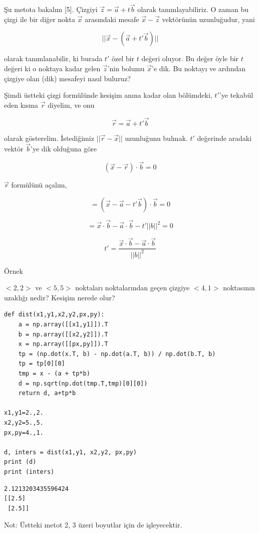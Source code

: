 \documentclass[12pt,fleqn]{article}\usepackage{../../common}
\begin{document}
Şu metota bakalım [5]. Çizgiyi $\vec{z} = \vec{a} + t \vec{b}$ olarak
tanımlayabiliriz. O zaman bu çizgi ile bir diğer nokta $\vec{x}$ arasındaki
mesafe $\vec{x}-\vec{z}$ vektörünün uzunluğudur, yani

$$
|| \vec{x} - (\vec{a} + t' \vec{b}) ||
$$

olarak tanımlanabilir, ki burada $t'$ özel bir $t$ değeri oluyor. Bu değer öyle
bir $t$ değeri ki o noktaya kadar gelen $\vec{z}$'nin bolumu $\vec{x}$'e dik. Bu
noktayı ve ardından çizgiye olan (dik) mesafeyi nasıl buluruz?

Şimdi üstteki çizgi formülünde kesişim anına kadar olan bölümdeki, $t'$'ye
tekabül eden kısma $\vec{r}$ diyelim, ve onu

$$
\vec{r} = \vec{a} + t' \vec{b}
$$

olarak gösterelim. İstediğimiz $||\vec{r}-\vec{x}||$ uzunluğunu bulmak. $t'$
değerinde aradaki vektör $\vec{b}$'ye dik olduğuna göre

$$
(\vec{x} - \vec{r}) \cdot \vec{b} = 0
$$

$\vec{r}$ formülünü açalım,

$$
= (\vec{x} - \vec{a} - t' \vec{b}) \cdot \vec{b} = 0
$$

$$
= \vec{x}\cdot\vec{b} - \vec{a}\cdot\vec{b} - t'||b||^2 = 0
$$

$$
t' = \frac{\vec{x}\cdot\vec{b} - \vec{a}\cdot\vec{b}}{||b||^2}
$$

Örnek

$<2,2>$ ve $<5,5>$ noktaları noktalarından geçen çizgiye $<4,1>$ noktasının
uzaklığı nedir? Kesişim nerede olur?

\begin{verbatim}
def dist(x1,y1,x2,y2,px,py):
    a = np.array([[x1,y1]]).T
    b = np.array([[x2,y2]]).T
    x = np.array([[px,py]]).T
    tp = (np.dot(x.T, b) - np.dot(a.T, b)) / np.dot(b.T, b)
    tp = tp[0][0]
    tmp = x - (a + tp*b)
    d = np.sqrt(np.dot(tmp.T,tmp)[0][0])
    return d, a+tp*b

x1,y1=2.,2.
x2,y2=5.,5.
px,py=4.,1.

d, inters = dist(x1,y1, x2,y2, px,py)
print (d)
print (inters)
\end{verbatim}

\begin{verbatim}
2.1213203435596424
[[2.5]
 [2.5]]
\end{verbatim}

Not: Üstteki metot 2, 3 üzeri boyutlar için de işleyecektir. 
\end{document}
